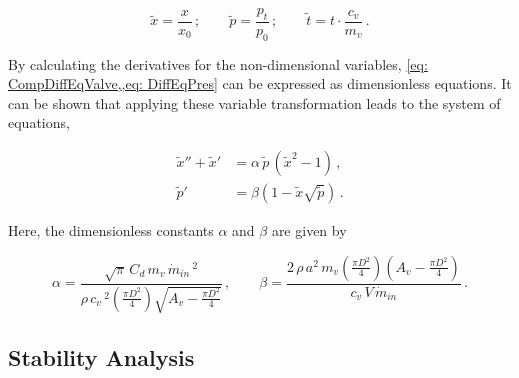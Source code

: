 \begin{equation*}
    \tilde{x} = \frac{x}{x_{0}} \, ; \qquad
    \tilde{p} = \frac{p_t}{p_{0}} \, ; \qquad 
    \tilde{t} = t \cdot \frac{c_v}{m_v} \, .
\end{equation*}



By calculating the derivatives for the non-dimensional variables, \cref{eq: CompDiffEqValve,,eq: DiffEqPres} can be expressed as dimensionless equations. It can be shown that applying these variable transformation leads to the system of equations,

\begin{equation} \label{eq: Non-DimODE}
\begin{split}
    \tilde{x}'' + \tilde{x}' &= \alpha \, \tilde{p} \, \left( \tilde{x}^2 - 1 \right) \, ,\\
    \tilde{p}' &= \beta \left( 1 - \tilde{x} \sqrt{\tilde{p}} \right) \, .
\end{split}
\end{equation}

Here, the dimensionless constants $\alpha$ and $\beta$ are given by

\begin{equation*}
    \alpha = %
    \frac{\sqrt{\pi} \, C_d \, m_v \, \dot{m}_{in}\,^2}{\rho \, c_v\,^2 \left( \frac{\pi D^2}{4} \right) \sqrt{A_v - \frac{\pi D^2}{4}} } \, , %
    \qquad
    \beta = %
    \frac{ 2 \, \rho \, a^2 \, m_v \left( \frac{\pi D^2}{4} \right) \left( A_v - \frac{\pi D^2}{4} \right) }{ c_v \, V \, \dot{m}_{in} } \, .
\end{equation*}

\subsection{Stability Analysis}


